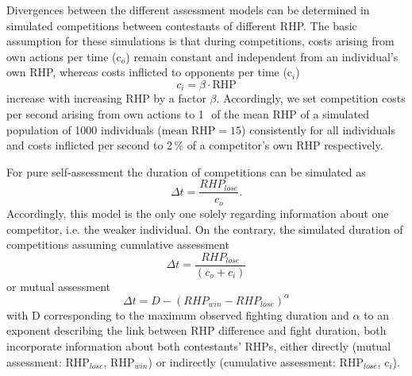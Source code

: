 \documentclass[11pt,pdftex]{article}
\begin{document}
Divergences between the different assessment models can be determined in simulated competitions between contestants of different RHP. The basic assumption for these simulations is that during competitions, costs arising from own actions per time (c$_o$) remain constant and independent from an individual's own RHP, whereas costs inflicted to opponents per time (c$_i$)
\begin{equation}
\label{inflicted_costs}
c_i = \beta \cdot \text{RHP}
\end{equation}
increase with increasing RHP by a factor $\beta$. Accordingly, we set competition costs per second arising from own actions to 1\,\textperthousand\, of the mean RHP of a simulated population of 1000 individuals ($\text{mean RHP} = 15$) consistently for all individuals and costs inflicted per second to 2\,\% of a competitor's own RHP respectively. 

For pure self-assessment the duration of competitions can be simulated as 
\begin{equation}
\label{self_assessment}
\Delta t = \frac{RHP_{lose}}{c_o}.
\end{equation}
Accordingly, this model is the only one solely regarding information about one competitor, i.e. the weaker individual. On the contrary, the simulated duration of competitions assuming cumulative assessment
 \begin{equation}
\label{cum_assessment}
\Delta t = \frac{RHP_{lose}}{(c_o + c_i)}
\end{equation}
or mutual assessment
\begin{equation}
\label{mutual_assessment}
\Delta t = D - (RHP_{win} - RHP_{lose})^{\alpha}
\end{equation}
with D corresponding to the maximum observed fighting duration and $\alpha$ to an exponent describing the link between RHP difference and fight duration, both incorporate information about both contestants' RHPs, either directly (mutual assessment: RHP$_{lose}$, RHP$_{win}$) or indirectly (cumulative assessment: RHP$_{lose}$, c$_i$). 
\end{document}
